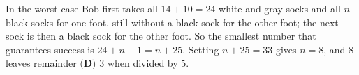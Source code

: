In the worst case Bob first takes all $14+10=24$ white and gray socks and all $n$ black socks for one foot, still without a black sock for the other foot; the next sock is then a black sock for the other foot. So the smallest number that guarantees success is $24+n+1=n+25$. Setting $n+25=33$ gives $n=8$, and $8$ leaves remainder $\boxed{\textbf{(D) }3}$ when divided by $5$.
